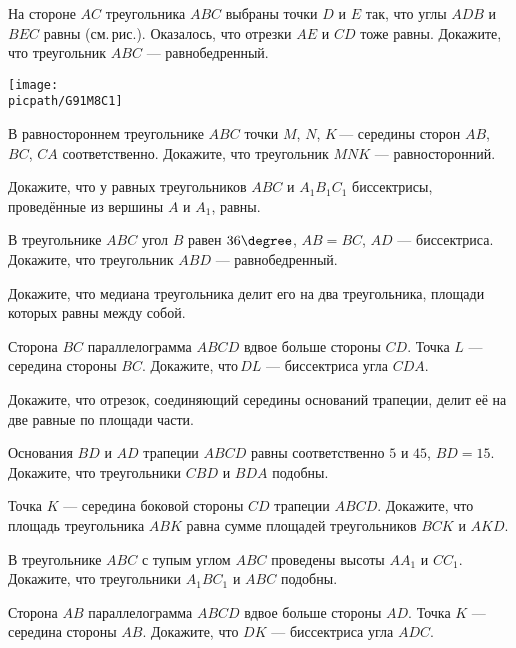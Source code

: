 \begin{consultation}
	\begin{listofex}
		\item \begin{minipage}[t]{\bodywidth}
			На стороне \( AC \) треугольника \( ABC \) выбраны точки \( D \) и \( E \) так, что углы \( ADB \) и \( BEC \) равны (см. рис.). Оказалось, что отрезки \( AE \) и \( CD \) тоже равны. Докажите, что треугольник \( ABC \) --- равнобедренный.
		\end{minipage}
		\gapwidth
		\begin{minipage}[t]{\picwidth}
			\texttt{[image: \\picpath/G91M8C1]}
		\end{minipage}
		\item В равностороннем треугольнике \( ABC \) точки \( M \), \( N \), \( K \) --- середины сторон \( AB \), \( BC \), \( CA \) соответственно. Докажите, что треугольник \( MNK \) --- равносторонний.
		\item Докажите, что у равных треугольников \( ABC \) и \( A_1B_1C_1 \) биссектрисы, проведённые из вершины  \( A \) и \( A_1 \), равны.
		\item В треугольнике \( ABC \) угол \( B \) равен \( 36\degree \), \( AB=BC \), \( AD \) --- биссектриса. Докажите, что треугольник \( ABD \) --- равнобедренный.
		\item Докажите, что медиана треугольника делит его на два треугольника, площади которых равны между собой.
		\item Сторона \( BC \) параллелограмма \( ABCD \) вдвое больше стороны \( CD \). Точка \( L \) --- середина стороны \( BC \). Докажите, что \( DL \) --- биссектриса угла \( CDA \).
		\item Докажите, что отрезок, соединяющий середины оснований трапеции, делит её на две равные по площади части.
	\end{listofex}
\end{consultation}

\begin{consultation}
	\begin{listofex}
		\item Основания \( BD \) и \( AD \) трапеции \( ABCD \) равны соответственно \( 5 \) и \( 45 \), \( BD=15 \). Докажите, что треугольники \( CBD \) и \( BDA \) подобны.
		\item Точка \( K \) --- середина боковой стороны \( CD \) трапеции \( ABCD \). Докажите, что площадь треугольника \( ABK \) равна сумме площадей треугольников \( BCK \) и \( AKD \).
		\item В треугольнике \( ABC \) с тупым углом \( ABC \) проведены высоты \( AA_1 \) и \( CC_1 \). Докажите, что треугольники \( A_1BC_1 \) и \( ABC \) подобны.\\
		\item Сторона \( AB \) параллелограмма \( ABCD \) вдвое больше стороны \( AD \). Точка \( K \) --- середина стороны \( AB \). Докажите, что \( DK \) --- биссектриса угла \( ADC \).
	\end{listofex}
\end{consultation}

